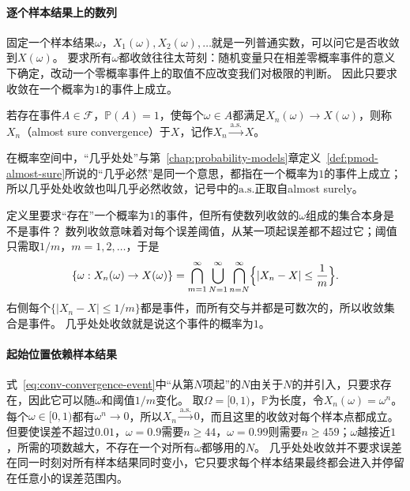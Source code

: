 \paragraph{逐个样本结果上的数列}
固定一个样本结果$\omega$，$X_1(\omega),X_2(\omega),\ldots$就是一列普通实数，可以问它是否收敛到$X(\omega)$。
要求所有$\omega$都收敛往往太苛刻：随机变量只在相差零概率事件的意义下确定，改动一个零概率事件上的取值不应改变我们对极限的判断。
因此只要求收敛在一个概率为$1$的事件上成立。

\begin{definition}[几乎处处收敛]
\label{def:conv-almost-sure}
若存在事件$A\in\mathcal F$，$\mathbb P(A)=1$，使每个$\omega\in A$都满足$X_n(\omega)\to X(\omega)$，则称$X_n$（almost sure convergence）于$X$，记作$X_n\xrightarrow{\mathrm{a.s.}}X$。
\end{definition}

在概率空间中，“几乎处处”与第~\ref{chap:probability-models}章定义~\ref{def:pmod-almost-sure}所说的“几乎必然”是同一个意思，都指在一个概率为$1$的事件上成立；所以几乎处处收敛也叫几乎必然收敛，记号中的$\mathrm{a.s.}$正取自almost surely。

定义里要求“存在”一个概率为$1$的事件，但所有使数列收敛的$\omega$组成的集合本身是不是事件？
数列收敛意味着对每个误差阈值，从某一项起误差都不超过它；阈值只需取$1/m$，$m=1,2,\ldots$，于是
\begin{equation}
  \{\omega:X_n(\omega)\to X(\omega)\}
  =\bigcap_{m=1}^{\infty}\bigcup_{N=1}^{\infty}\bigcap_{n=N}^{\infty}\Bigl\{|X_n-X|\leq\frac1m\Bigr\}.
  \label{eq:conv-convergence-event}
\end{equation}
右侧每个$\{|X_n-X|\leq1/m\}$都是事件，而所有交与并都是可数次的，所以收敛集合是事件。
几乎处处收敛就是说这个事件的概率为$1$。

\paragraph{起始位置依赖样本结果}
式~\eqref{eq:conv-convergence-event}中“从第$N$项起”的$N$由关于$N$的并引入，只要求存在，因此它可以随$\omega$和阈值$1/m$变化。
取$\Omega=[0,1)$，$\mathbb P$为长度，令$X_n(\omega)=\omega^n$。
每个$\omega\in[0,1)$都有$\omega^n\to0$，所以$X_n\xrightarrow{\mathrm{a.s.}}0$，而且这里的收敛对每个样本点都成立。
但要使误差不超过$0.01$，$\omega=0.9$需要$n\geq44$，$\omega=0.99$则需要$n\geq459$；$\omega$越接近$1$，所需的项数越大，不存在一个对所有$\omega$都够用的$N$。
几乎处处收敛并不要求误差在同一时刻对所有样本结果同时变小，它只要求每个样本结果最终都会进入并停留在任意小的误差范围内。


